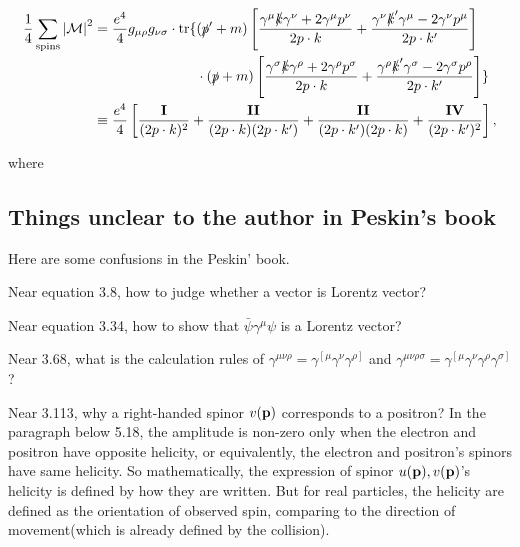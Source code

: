 \begin{align}
    \recip{4}\sum_{\mathrm{spins}}\abs{\mathcal{M}}^2 &=
    \begin{aligned}[t]
        \frac{e^4}{4}g_{\mu\rho}g_{\nu\sigma}\cdot\mathrm{tr}
        \{
            &(\slashed{p}^\prime+m)
            \left[
                \frac{\gamma^\mu\slashed{k}\gamma^\nu+2\gamma^\mu p^\nu}{2p\cdot k}
                + \frac{\gamma^\nu\slashed{k}^\prime\gamma^\mu-2\gamma^\nu p^\mu}{2p\cdot k^\prime}
            \right] \notag \\
            &\cdot(\slashed{p}+m)
            \left[
                \frac{\gamma^\sigma\slashed{k}\gamma^\rho+2\gamma^\rho p^\sigma}{2p\cdot k}
                + \frac{\gamma^\rho\slashed{k}^\prime\gamma^\sigma-2\gamma^\sigma p^\rho}{2p\cdot k^\prime}
            \right]
        \} \notag \\
    \end{aligned} \\
    &\equiv \frac{e^4}{4}
    \left[
        \frac{\boldsymbol{\mathrm{I}}}{(2p\cdot k)^2} + \frac{\boldsymbol{\mathrm{II}}}{(2p\cdot k)(2p\cdot k^\prime)}
        + \frac{\boldsymbol{\mathrm{II}}}{(2p\cdot k^\prime)(2p\cdot k)} + \frac{\boldsymbol{\mathrm{IV}}}{(2p\cdot k^\prime)^2}
    \right],
\end{align}

where


\subsection{Things unclear to the author in Peskin's book}

Here are some confusions in the Peskin' book.

Near equation 3.8, how to judge whether a vector is Lorentz vector?

Near equation 3.34, how to show that $\bar{\psi}\gamma^\mu\psi$ is a Lorentz vector?

Near 3.68, what is the calculation rules of $\gamma^{\mu\nu\rho}=\gamma^{\left[\mu\right.}\gamma^\nu\gamma^{\left.\rho\right]}$ and $\gamma^{\mu\nu\rho\sigma}=\gamma^{\left[\mu\right.}\gamma^\nu\gamma^\rho\gamma^{\left.\sigma\right]}$?

Near 3.113, why a right-handed spinor $v(\bf{p})$ corresponds to a positron?
In the paragraph below 5.18, the amplitude is non-zero only when the electron and positron have opposite helicity,
or equivalently, the electron and positron's spinors have same helicity.
So mathematically, the expression of spinor $u(\bf{p}),v(\bf{p})$'s helicity is defined by how they are written.
But for real particles, the helicity are defined as the orientation of observed spin, comparing to the direction of movement(which is already defined by the collision).

\clearpage
